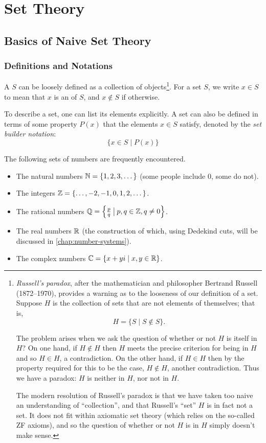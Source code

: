 \chapter{Set Theory}\label{chap:set-theory}

\section{Basics of Naive Set Theory}
\subsection{Definitions and Notations}
A  $S$ can be loosely defined as a collection of objects\footnote{\emph{Russell's paradox}, after the mathematician and philosopher Bertrand Russell (1872--1970), provides a warning as to the looseness of our definition of a set. Suppose $H$ is the collection of sets that are not elements of themselves; that is,
\[H=\{S\mid S\notin S\}.\]

The problem arises when we ask the question of whether or not $H$ is itself in $H$? On one hand, if $H\notin H$ then $H$ meets the precise criterion for being in $H$ and so $H\in H$, a contradiction. On the other hand, if $H\in H$ then by the property required for this to be the case, $H\notin H$, another contradiction. Thus we have a paradox: $H$ is neither in $H$, nor not in $H$.

The modern resolution of Russell's paradox is that we have taken too naive an understanding of ``collection'', and that Russell's ``set'' $H$ is in fact not a set. It does not fit within axiomatic set theory (which relies on the so-called ZF axioms), and so the question of whether or not $H$ is in $H$ simply doesn't make sense.}. For a set $S$, we write $x \in S$ to mean that $x$ is an  of $S$, and $x \notin S$ if otherwise. 

To describe a set, one can list its elements explicitly. A set can also be defined in terms of some property $P(x)$ that the elements $x \in S$ satisfy, denoted by the \emph{set builder notation}:
\[\{x\in S \mid P(x)\}\]

The following sets of numbers are frequently encountered.
\begin{itemize}
\item The natural numbers $\mathbb N=\{1,2,3,\dots\}$ (some people include $0$, some do not).
\item The integers $\mathbb Z=\{\dots,-2,-1,0,1,2,\dots\}$.
\item The rational numbers $\mathbb Q=\left\{\frac{p}{q}\:\big|\:p,q\in\mathbb Z, q\neq0\right\}$.
\item The real numbers $\mathbb R$ (the construction of which, using Dedekind cuts, will be discussed in \cref{chap:number-systems}).
\item The complex numbers $\mathbb C=\{x+yi \mid x,y\in\mathbb R\}$.
\end{itemize}

